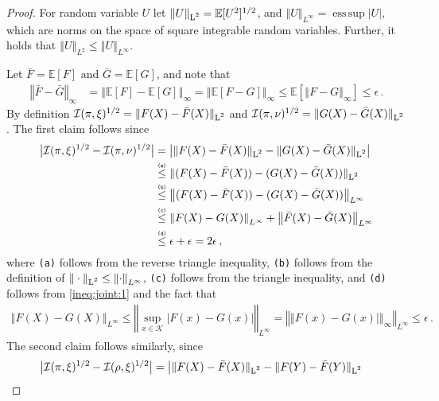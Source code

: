 \documentclass[letter, 12pt]{report}
\newcommand{\esssup}{\operatorname{ess\,sup}}
\newcommand{\explan}[1]{\stackrel{\text{\tiny \texttt{#1}}}}
\newcommand{\norm}[1]{\left \Vert  #1 \right \Vert}
\newcommand{\Lsnorm}[1]{ \Vert  #1 \Vert_{\text{\scriptsize \textrm{L}$^2$}}}
\newcommand{\E}{\mathbb E}
\newcommand{\cK}{\mathcal K}
\newcommand{\cI}{\mathcal I}
\newcommand{\1}{\mathbf{1}}
\theoremstyle{plain}
\theoremstyle{definition}
\theoremstyle{remark}
\begin{document}
\begin{proof}
    For random variable $U$ let $\Lsnorm{U} = \E[U^2]^{1/2}$, and $\norm{U}_{L^\infty}=\esssup |U|$, which are norms on the space of square integrable random variables.
    Further, it holds that $\norm{U}_{L^2} \leq \norm{U}_{L^\infty}$.

    Let $\bar F = \E[F]$ and $\bar G = \E[G]$, and note that
    \begin{align}
        \norm{\bar{F} - \bar{G}}_\infty
         & = \norm{\E[F] - \E[G]}_\infty
        = \norm{\E[F - G]}_\infty
        \leq \E[\norm{F - G}_\infty]
        \leq \epsilon \,.
        \label{ineq:joint:1}
    \end{align}
    By definition $\cI(\pi, \xi)^{1/2} = \Lsnorm{F(X) - \bar F(X)}$ and $\cI(\pi, \nu)^{1/2} = \Lsnorm{G(X) - \bar G(X)}$.
    The first claim follows since
    \begin{align*}
        \big|\cI(\pi, \xi)^{1/2} - \cI(\pi, \nu)^{1/2}\big|
         & =
        \big|
        \Lsnorm{F(X) - \bar F(X)} - \Lsnorm{G(X) - \bar G(X)}
        \big|
        \\
         &
        \explan{(a)}
        \leq
        \Lsnorm{(F(X) - \bar{F}(X)) - (G(X) - \bar{G}(X))}          \\
         &
        \explan{(b)}
        \leq
        \norm{(F(X) - \bar{F}(X)) - (G(X) - \bar{G}(X))}_{L^\infty} \\
         &
        \explan{(c)}
        \leq
        \norm{F(X) - G(X)}_{L^\infty} + \norm{\bar{F}(X) - \bar{G}(X)}_{L^\infty}
        \\
         &
        \explan{(d)}
        \leq
        \epsilon + \epsilon
        = 2\epsilon \,,
    \end{align*}
    where \texttt{(a)} follows from the reverse triangle inequality,
    \texttt{(b)} follows from the definition of $\Lsnorm{\cdot} \leq \norm{\cdot}_{L^\infty}$,
    \texttt{(c)} follows from the triangle inequality, and
    \texttt{(d)}
    follows from \cref{ineq:joint:1} and the fact that
    \begin{align*}
        \norm{F(X) - G(X)}_{L^\infty}
        \leq
        \norm{\sup_{x \in \cK} |F(x) - G(x)|}_{L^\infty}
        =
        \norm{\norm{F(x) - G(x)|}_\infty}_{L^\infty}\leq \epsilon\,.
    \end{align*}
    The second claim follows similarly, since
    \begin{align*}
        \big| \cI(\pi, \xi)^{1/2} - \cI(\rho, \xi)^{1/2}\big|
         & =
        \big|
        \Lsnorm{F(X) - \bar F(X)} - \Lsnorm{F(Y) - \bar F(Y)}

\end{align*}
\end{proof}
\end{document}
